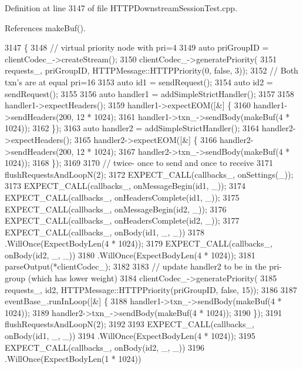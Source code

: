 Definition at line 3147 of file H\+T\+T\+P\+Downstream\+Session\+Test.\+cpp.



References make\+Buf().


\begin{DoxyCode}
3147                                                         \{
3148   \textcolor{comment}{// virtual priority node with pri=4}
3149   \textcolor{keyword}{auto} priGroupID = clientCodec\_->createStream();
3150   clientCodec\_->generatePriority(
3151     requests\_, priGroupID, HTTPMessage::HTTPPriority(0, \textcolor{keyword}{false}, 3));
3152   \textcolor{comment}{// Both txn's are at equal pri=16}
3153   \textcolor{keyword}{auto} id1 = sendRequest();
3154   \textcolor{keyword}{auto} id2 = sendRequest();
3155 
3156   \textcolor{keyword}{auto} handler1 = addSimpleStrictHandler();
3157 
3158   handler1->expectHeaders();
3159   handler1->expectEOM([&] \{
3160       handler1->sendHeaders(200, 12 * 1024);
3161       handler1->txn\_->sendBody(makeBuf(4 * 1024));
3162     \});
3163   \textcolor{keyword}{auto} handler2 = addSimpleStrictHandler();
3164   handler2->expectHeaders();
3165   handler2->expectEOM([&] \{
3166       handler2->sendHeaders(200, 12 * 1024);
3167       handler2->txn\_->sendBody(makeBuf(4 * 1024));
3168     \});
3169 
3170   \textcolor{comment}{// twice- once to send and once to receive}
3171   flushRequestsAndLoopN(2);
3172   EXPECT\_CALL(callbacks\_, onSettings(\_));
3173   EXPECT\_CALL(callbacks\_, onMessageBegin(id1, \_));
3174   EXPECT\_CALL(callbacks\_, onHeadersComplete(id1, \_));
3175   EXPECT\_CALL(callbacks\_, onMessageBegin(id2, \_));
3176   EXPECT\_CALL(callbacks\_, onHeadersComplete(id2, \_));
3177   EXPECT\_CALL(callbacks\_, onBody(id1, \_, \_))
3178     .WillOnce(ExpectBodyLen(4 * 1024));
3179   EXPECT\_CALL(callbacks\_, onBody(id2, \_, \_))
3180     .WillOnce(ExpectBodyLen(4 * 1024));
3181   parseOutput(*clientCodec\_);
3182 
3183   \textcolor{comment}{// update handler2 to be in the pri-group (which has lower weight)}
3184   clientCodec\_->generatePriority(
3185     requests\_, id2, HTTPMessage::HTTPPriority(priGroupID, \textcolor{keyword}{false}, 15));
3186 
3187   eventBase\_.runInLoop([&] \{
3188       handler1->txn\_->sendBody(makeBuf(4 * 1024));
3189       handler2->txn\_->sendBody(makeBuf(4 * 1024));
3190     \});
3191   flushRequestsAndLoopN(2);
3192 
3193   EXPECT\_CALL(callbacks\_, onBody(id1, \_, \_))
3194     .WillOnce(ExpectBodyLen(4 * 1024));
3195   EXPECT\_CALL(callbacks\_, onBody(id2, \_, \_))
3196     .WillOnce(ExpectBodyLen(1 * 1024))

\end{DoxyCode}
